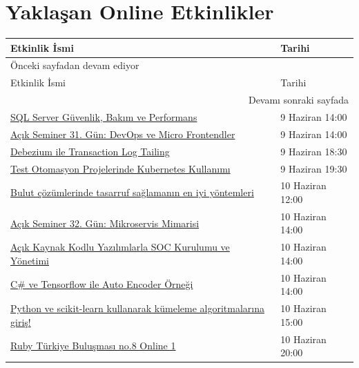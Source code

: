 \documentclass[11pt]{article}
\begin{document}
\section{Yaklaşan Online Etkinlikler}
\label{sec:org0117f32}
\begin{longtable}{|p{9.5cm}|l|}
\hline
Etkinlik İsmi & Tarihi\\
\hline
\endfirsthead
\multicolumn{2}{l}{Önceki sayfadan devam ediyor} \\
\hline

Etkinlik İsmi & Tarihi \\

\hline
\endhead
\hline\multicolumn{2}{r}{Devamı sonraki sayfada} \\
\endfoot
\endlastfoot
\hline
\href{https://kommunity.com/cozumpark/events/cozumpark-sql-tech-talk-live-guvenlik-bakim-ve-performans-363df7aa}{SQL Server Güvenlik, Bakım ve Performans} & 9 Haziran 14:00\\
\href{https://kommunity.com/tracikkaynak/events/acik-seminer-31-gun-devops-ve-micro-frontendler-8b2de35c}{Açık Seminer 31. Gün: DevOps ve Micro Frontendler} & 9 Haziran 14:00\\
\href{https://www.meetup.com/tr-TR/trendyol/events/270950447}{Debezium ile Transaction Log Tailing} & 9 Haziran 18:30\\
\href{https://www.meetup.com/tr-TR/TestHive/events/270909328}{Test Otomasyon Projelerinde Kubernetes Kullanımı} & 9 Haziran 19:30\\
\href{https://kommunity.com/cloud-and-serverless-turkey/events/bulut-cozumlerinde-tasarruf-saglamanin-en-iyi-yontemleri-8b9464e4}{Bulut çözümlerinde tasarruf sağlamanın en iyi yöntemleri} & 10 Haziran 12:00\\
\href{https://kommunity.com/tracikkaynak/events/acik-seminer-32-gun-78318ade}{Açık Seminer 32. Gün: Mikroservis Mimarisi} & 10 Haziran 14:00\\
\href{https://kommunity.com/cozumpark/events/teknoloji-sohbetleri-acik-kaynak-kodlu-yazilimlarla-soc-kurulumu-ve-yonetimi-a7da5264}{Açık Kaynak Kodlu Yazılımlarla SOC Kurulumu ve Yönetimi} & 10 Haziran 14:00\\
\href{https://www.meetup.com/tr-TR/Teknolot/events/270951400}{C\# ve Tensorflow ile Auto Encoder Örneği} & 10 Haziran 14:00\\
\href{https://www.meetup.com/tr-TR/IBMDeveloperTR/events/270784273}{Python ve scikit-learn kullanarak kümeleme algoritmalarına giriş!} & 10 Haziran 15:00\\
\href{https://kommunity.com/ruby-turkiye/events/ruby-turkiye-bulusmasi-8-online-1-7166a878}{Ruby Türkiye Buluşması no.8 Online 1} & 10 Haziran 20:00\\

\end{longtable}
\end{document}
